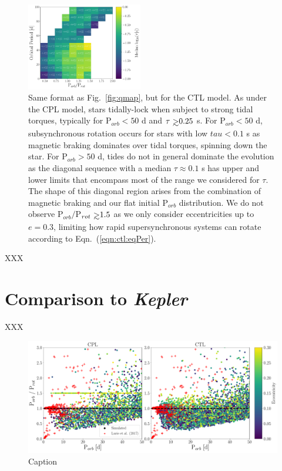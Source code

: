 \documentclass[twocolumn]{aastex61}
\def\gsim{~\rlap{$>$}{\lower 1.0ex\hbox{$\sim$}}}
\newcommand{\kepler}[0]{\textit{Kepler}\xspace}
\begin{document}
\begin{figure}
	\includegraphics[width=0.45\textwidth]{../Plots/porbProtPorbTauHist.pdf}
   \caption{Same format as Fig.~\ref{fig:qmap}, but for the CTL model. As under the CPL model, stars tidally-lock when subject to strong tidal torques, typically for P$_{orb} < 50$ d and $\tau \gsim 0.25$ s.  For P$_{orb} < 50$ d, subsynchronous rotation occurs for stars with low $tau < 0.1$ s as magnetic braking dominates over tidal torques, spinning down the star.  For P$_{orb} > 50$ d, tides do not in general dominate the evolution as the diagonal sequence with a median $\tau \approx 0.1$ s has upper and lower limits that encompass most of the range we considered for $\tau$.  The shape of this diagonal region arises from the combination of magnetic braking and our flat initial P$_{orb}$ distribution. We do not observe P$_{orb}/$P$_{rot} \gsim 1.5$ as we only consider eccentricities up to $e = 0.3$, limiting how rapid supersynchronous systems can rotate according to Eqn.~(\ref{eqn:ctl:eqPer}).}%
    \label{fig:taumap}%
\end{figure}

XXX

\section{Comparison to \kepler} \label{sec:kepler}

XXX

\begin{figure}[t]
	\includegraphics[width=\textwidth]{../Plots/lurieFig7.pdf}
   \caption{Caption}%
    \label{fig:lurie7}%
\end{figure}
\end{document}
